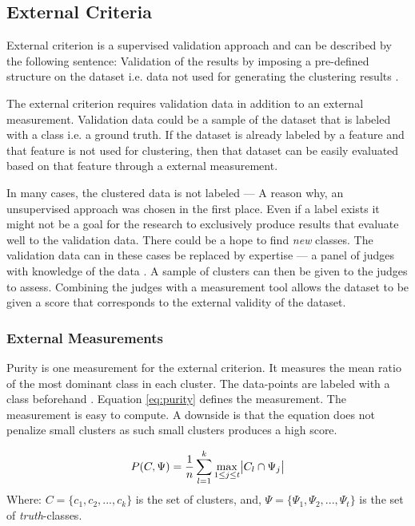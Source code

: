 \documentclass[../report.tex]{subfiles}
\begin{document}
\subsection{External Criteria}
External criterion is a supervised validation approach and can be described by the following sentence: Validation of the results by imposing a pre-defined structure on the dataset i.e. data not used for generating the clustering results \cite{Halkidi2002}.

The external criterion requires validation data in addition to an external measurement. Validation data could be a sample of the dataset that is labeled with a class i.e. a ground truth. If the dataset is already labeled by a feature and that feature is not used for clustering, then that dataset can be easily evaluated based on that feature through a external measurement.

In many cases, the clustered data is not labeled --- A reason why, an unsupervised approach was chosen in the first place. Even if a label exists it might not be a goal for the research to exclusively produce results that evaluate well to the validation data. There could be a hope to find \textit{new} classes. The validation data can in these cases be replaced by expertise --- a panel of judges with knowledge of the data \cite{manning2010introduction}. A sample of clusters can then be given to the judges to assess. Combining the judges with a measurement tool allows the dataset to be given a score that corresponds to the external validity of the dataset.

\subsubsection{External Measurements}
Purity is one measurement for the external criterion. It measures the mean ratio of the most dominant class in each cluster. The data-points are labeled with a class beforehand \cite{manning2010introduction}. Equation \ref{eq:purity} defines the measurement. The measurement is easy to compute. A downside is that the equation does not penalize small clusters as such small clusters produces a high score.

\begin{equation}
  \label{eq:purity}
  P(C, \Psi) = \frac{1}{n}\sum^{k}_{l=1}\max_{1 \leq j \leq t}\abs{C_l \cap \Psi_j}
\end{equation}
Where:\newline
$C = \{c_1,c_2,...,c_k\}$ is the set of clusters, and,
$\Psi = \{\Psi_1,\Psi_2,...,\Psi_t \}$ is the set of \textit{truth}-classes.
\end{document}
